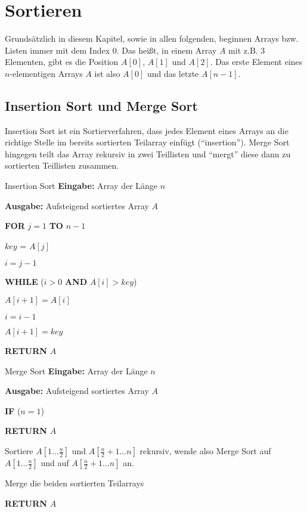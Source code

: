 \documentclass{panikzettel}
\newcommand\tab[1][1cm]{\hspace*{#1}}
\begin{document}
\newpage
\section{Sortieren}

Grundsätzlich in diesem Kapitel, sowie in allen folgenden, beginnen Arrays bzw. Listen immer mit dem Index 0. Das heißt, in einem Array $A$ mit z.B. 3 Elementen, gibt es die Position $A[0]$, $A[1]$ und $A[2]$. Das erste Element eines $n$-elementigen Arrays $A$ ist also $A[0]$ und das letzte $A[n-1]$.

\subsection{Insertion Sort und Merge Sort}

Insertion Sort ist ein Sortierverfahren, dass jedes Element eines Arrays an die richtige Stelle im bereits sortierten Teilarray einfügt (``insertion''). Merge Sort hingegen teilt das Array rekursiv in zwei Teillisten und ``mergt'' diese dann zu sortierten Teillisten zusammen.

\begin{halfboxl}
	\vspace{-\baselineskip}
	\begin{algo}{Insertion Sort}
		\textbf{Eingabe:} Array der Länge $n$
		
		\textbf{Ausgabe:} Aufsteigend sortiertes Array $A$
		\tcblower
		
		\textbf{FOR} $j=1$ \textbf{TO} $n-1$
		
		\tab $key$ = $A[j]$
		
		\tab $i = j-1$
		
		\tab \textbf{WHILE} ($i>0$ \textbf{AND} $A[i]>key$)
		
		\tab\tab $A[i+1] = A[i]$
		
		\tab\tab $i =i-1$
		
		\tab $A[i+1] = key$
		
		\textbf{RETURN} $A$
	\end{algo}
\end{halfboxl}%
\begin{halfboxr}
	\vspace{-\baselineskip}
	\begin{algo}{Merge Sort}
		\textbf{Eingabe:} Array der Länge $n$
		
		\textbf{Ausgabe:} Aufsteigend sortiertes Array $A$
		\tcblower
		
		\textbf{IF} ($n=1$)
		
		\tab \textbf{RETURN} $A$
		
		Sortiere $A[1 \dots \frac{n}{2}]$ und $A[\frac{n}{2} +1 \dots n]$ rekursiv, wende also Merge Sort auf $A[1 \dots \frac{n}{2}]$ und auf $A[\frac{n}{2} +1 \dots n]$ an. 
		
		Merge die beiden sortierten Teilarrays
		
		\textbf{RETURN} $A$
	\end{algo}
\end{halfboxr}
\end{document}
